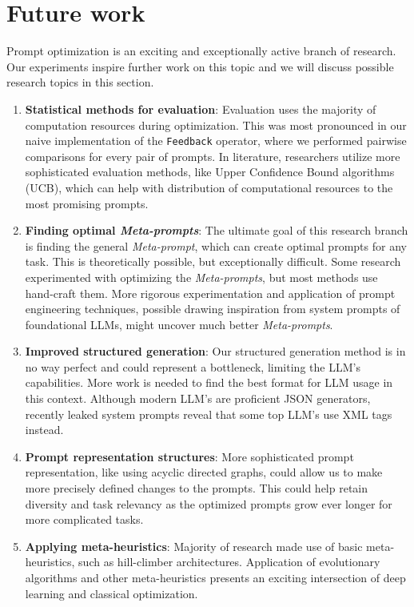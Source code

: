 \section{Future work}
Prompt optimization is an exciting and exceptionally active branch of research. 
Our experiments inspire further work on this topic and we will discuss possible research topics in this section.
\begin{enumerate}
    \item \textbf{Statistical methods for evaluation}: Evaluation uses the majority of computation resources during optimization. This was most pronounced in our naive implementation of the \texttt{Feedback} operator, where we performed pairwise comparisons for every pair of prompts. In literature\cite{pryzant2023automaticpromptoptimizationgradient}\cite{zhang2024sprigimprovinglargelanguage}, researchers utilize more sophisticated evaluation methods, like Upper Confidence Bound algorithms (UCB), which can help with distribution of computational resources to the most promising prompts.
    \item \textbf{Finding optimal \textit{Meta-prompts}}: The ultimate goal of this research branch is finding the general \textit{Meta-prompt}, which can create optimal prompts for any task. This is theoretically possible\cite{dewynter2024metaprompting}, but exceptionally difficult. Some research\cite{fernando2023promptbreederselfreferentialselfimprovementprompt} experimented with optimizing the \textit{Meta-prompts}, but most methods use hand-craft them. More rigorous experimentation and application of prompt engineering techniques, possible drawing inspiration from system prompts of foundational LLMs, might uncover much better \textit{Meta-prompts}.
    \item \textbf{Improved structured generation}: Our structured generation method is in no way perfect and could represent a bottleneck, limiting the LLM's capabilities. More work is needed to find the best format for LLM usage in this context. Although modern LLM's are proficient JSON generators, recently leaked system prompts reveal that some top LLM's use XML tags instead. 
    \item \textbf{Prompt representation structures}: More sophisticated prompt representation, like using acyclic directed graphs\cite{zhang2024sprigimprovinglargelanguage}, could allow us to make more precisely defined changes to the prompts. This could help retain diversity and task relevancy as the optimized prompts grow ever longer for more complicated tasks.
    \item \textbf{Applying meta-heuristics}: Majority of research made use of basic meta-heuristics, such as hill-climber architectures. Application of evolutionary algorithms\cite{guo2024connectinglargelanguagemodels} and other meta-heuristics\cite{pan2024plumpromptlearningusing} presents an exciting intersection of deep learning and classical optimization.

\end{enumerate}
